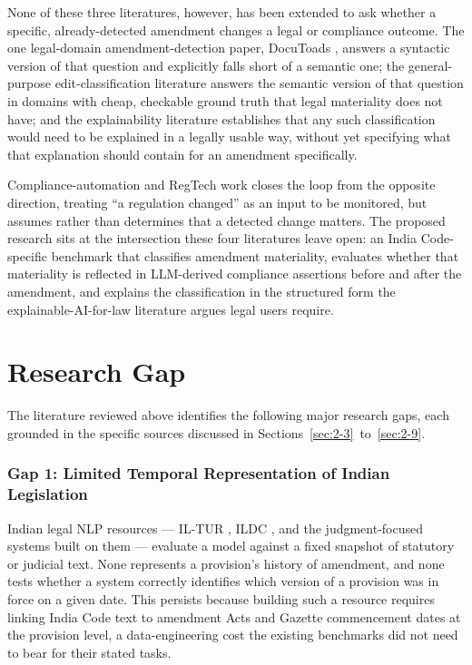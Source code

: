 None of these three literatures, however, has been extended to ask whether a specific, already-detected amendment changes a legal or compliance outcome. The one legal-domain amendment-detection paper, DocuToads \cite{hermansson2016docutoads}, answers a syntactic version of that question and explicitly falls short of a semantic one; the general-purpose edit-classification literature \cite{daxenberger2013wikipedia,spangher2022newsedits} answers the semantic version of that question in domains with cheap, checkable ground truth that legal materiality does not have; and the explainability literature \cite{richmond2024xaisurvey,collenette2023ecthr} establishes that any such classification would need to be explained in a legally usable way, without yet specifying what that explanation should contain for an amendment specifically.

Compliance-automation and RegTech work \cite{bonatti2020pronto,li2025regtech,hassani2024llmcompliance} closes the loop from the opposite direction, treating “a regulation changed” as an input to be monitored, but assumes rather than determines that a detected change matters. The proposed research sits at the intersection these four literatures leave open: an India Code-specific benchmark that classifies amendment materiality, evaluates whether that materiality is reflected in LLM-derived compliance assertions before and after the amendment, and explains the classification in the structured form the explainable-AI-for-law literature argues legal users require.

\section{Research Gap}

\label{sec:2-12}

The literature reviewed above identifies the following major research gaps, each grounded in the specific sources discussed in Sections~\ref{sec:2-3}~to~\ref{sec:2-9}.

\subsubsection{Gap 1: Limited Temporal Representation of Indian Legislation}

Indian legal NLP resources — IL-TUR \cite{joshi2024iltur}, ILDC \cite{malik2021ildc}, and the judgment-focused systems built on them \cite{nigam2025nyayarag,nigam2025tathyanyaya,bose2026falkorirac} — evaluate a model against a fixed snapshot of statutory or judicial text. None represents a provision's history of amendment, and none tests whether a system correctly identifies which version of a provision was in force on a given date. This persists because building such a resource requires linking India Code text to amendment Acts and Gazette commencement dates at the provision level, a data-engineering cost the existing benchmarks did not need to bear for their stated tasks.

